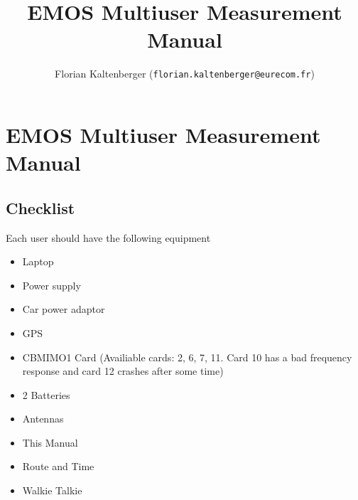 \documentclass[10pt,a4paper]{article}
\begin{document}
\author{Florian Kaltenberger (\texttt{florian.kaltenberger@eurecom.fr})}
\title{EMOS Multiuser Measurement Manual}

\maketitle

\section{EMOS Multiuser Measurement Manual}

\subsection{Checklist}

Each user should have the following equipment

\begin{itemize}
\item  Laptop
\item  Power supply
\item Car power adaptor
\item GPS
\item CBMIMO1 Card (Availiable cards: 2, 6, 7, 11. Card 10 has a bad frequency response and card 12 crashes after some time)
\item 2 Batteries
\item Antennas
\item This Manual
\item Route and Time
\item Walkie Talkie
\end{itemize} 
\end{document}
